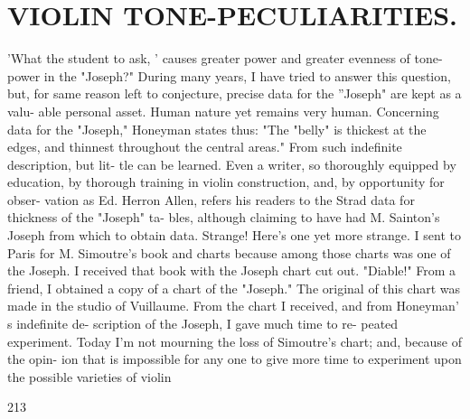 \documentclass{article}
\begin{document}
\section*{VIOLIN TONE-PECULIARITIES.}
'What the student to ask, ' causes greater power and greater evenness of tone-power in the "Joseph?" During many years, I have tried to answer this question, but, for same reason left to conjecture, precise data for the ''Joseph" are kept as a valu- able personal asset. Human nature yet remains very human. Concerning data for the "Joseph," Honeyman states thus: "The "belly" is thickest at the edges, and thinnest throughout the central areas." From such indefinite description, but lit- tle can be learned. Even a writer, so thoroughly equipped by education, by thorough training in violin construction, and, by opportunity for obser- vation as Ed. Herron Allen, refers his readers to the Strad data for thickness of the "Joseph" ta- bles, although claiming to have had M. Sainton's Joseph from which to obtain data. Strange! Here's one yet more strange. I sent to Paris for M. Simoutre's book and charts because among those charts was one of the Joseph. I received that book with the Joseph chart cut out. "Diable!" From a friend, I obtained a copy of a chart of the "Joseph." The original of this chart was made in the studio of Vuillaume. From the chart I received, and from Honeyman' s indefinite de- scription of the Joseph, I gave much time to re- peated experiment. Today I'm not mourning the loss of Simoutre's chart; and, because of the opin- ion that is impossible for any one to give more time to experiment upon the possible varieties of violin

213
\end{document}
